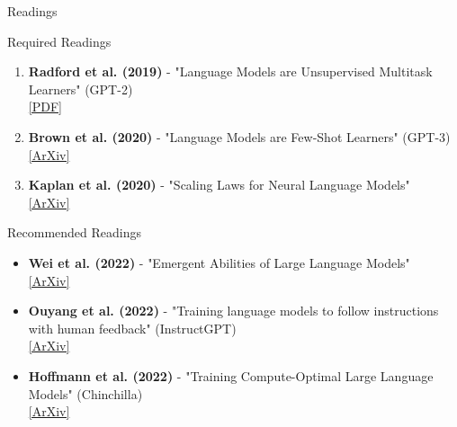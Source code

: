 \documentclass[aspectratio=169]{beamer}
\begin{document}
\begin{frame}[shrink=10]{Readings 📖}
\small
    \begin{block}{Required Readings}
        \begin{enumerate}\setlength{\itemsep}{0pt}
            \item \textbf{Radford et al. (2019)} - "Language Models are Unsupervised Multitask Learners" (GPT-2) \\
            \href{https://cdn.openai.com/better-language-models/language_models_are_unsupervised_multitask_learners.pdf}{[PDF]}

            \item \textbf{Brown et al. (2020)} - "Language Models are Few-Shot Learners" (GPT-3) \\
            \href{https://arxiv.org/abs/2005.14165}{[ArXiv]}

            \item \textbf{Kaplan et al. (2020)} - "Scaling Laws for Neural Language Models" \\
            \href{https://arxiv.org/abs/2001.08361}{[ArXiv]}
        \end{enumerate}
    \end{block}

    \vspace{0.3cm}

    \begin{block}{Recommended Readings}
        \begin{itemize}\setlength{\itemsep}{0pt}
            \item \textbf{Wei et al. (2022)} - "Emergent Abilities of Large Language Models" \\
            \href{https://arxiv.org/abs/2206.07682}{[ArXiv]}

            \item \textbf{Ouyang et al. (2022)} - "Training language models to follow instructions with human feedback" (InstructGPT) \\
            \href{https://arxiv.org/abs/2203.02155}{[ArXiv]}

            \item \textbf{Hoffmann et al. (2022)} - "Training Compute-Optimal Large Language Models" (Chinchilla) \\
            \href{https://arxiv.org/abs/2203.15556}{[ArXiv]}
        \end{itemize}
    \end{block}
\end{frame}
\end{document}
